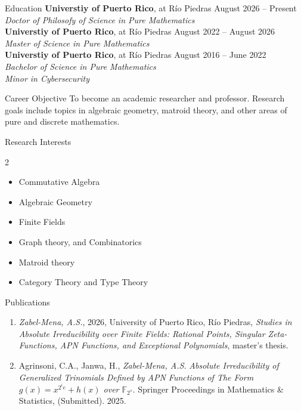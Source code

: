 \documentclass{resume}
\begin{document}
\begin{rSection}{Education}
 \textbf{Universtiy of Puerto Rico}, at R\'io Piedras
  \hfill August 2026 -- Present \\
  \textit{Doctor of Philosofy of Science in Pure Mathematics} \\

  \textbf{Universtiy of Puerto Rico}, at R\'io Piedras
  \hfill August 2022 -- August 2026  \\
  \textit{Master of Science in Pure Mathematics} \\

  \textbf{Universtiy of Puerto Rico}, at R\'io Piedras
  \hfill August 2016 -- June 2022  \\
  \textit{Bachelor of Science in Pure Mathematics}  \\
  \textit{Minor in Cybersecurity}
\end{rSection}

\begin{rSection}{Career Objective}
  To become an academic researcher and professor. Research goals
  include topics in algebraic geometry, matroid theory, and other
  areas of pure and discrete mathematics.
\end{rSection}

\begin{rSection}{Research Interests}
  \begin{multicols}{2}
    \begin{itemize}
      \item Commutative Algebra

      \item Algebraic Geometry

      \item Finite Fields

      \item Graph theory, and Combinatorics

      \item Matroid theory

      \item Category Theory and Type Theory
    \end{itemize}
  \end{multicols}
\end{rSection}


\begin{rSection}{Publications}
  \begin{enumerate}
    \item \textit{Zabel-Mena, A.S.}, 2026, University of Puerto Rico, R\'io
      Piedras, \textit{Studies in Absolute Irreducibility over Finite
      Fields: Rational Points, Singular Zeta-Functions, APN Functions,
      and Exceptional Polynomials}, master's thesis.
    \item Agrinsoni, C.A., Janwa, H., \textit{Zabel-Mena, A.S.}
      \textit{Absolute Irreducibility of Generalized
        Trinomials Defined by APN Functions of The Form
      $g(x)=x^{2^ie}+h(x)$ over $\mathbb{F}_{2^s}$}. Springer
      Proceedings in Mathematics \& Statistics, (Submitted).
      2025.
  \end{enumerate}
\end{rSection}
\end{document}
